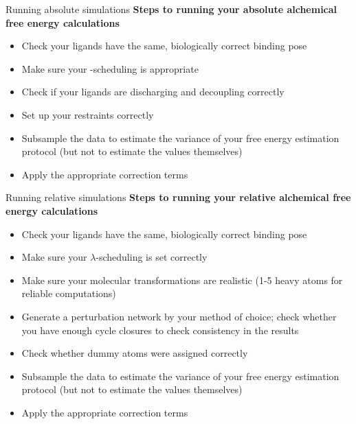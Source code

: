 \documentclass[9pt,bestpractices]{livecoms}
\begin{document}
\begin{Checklists*}
\begin{checklist}{Running absolute simulations}
        \textbf{Steps to running your absolute alchemical free energy calculations}
\begin{itemize}
 \item Check your ligands have the same, biologically correct binding pose
        \item Make sure your \textlambda-scheduling is  appropriate
        \item Check if your ligands are discharging and decoupling correctly
        \item Set up your restraints correctly
        \item Subsample the data to estimate the variance of your free energy estimation protocol (but not to estimate the values themselves)
        \item Apply the appropriate correction terms
\end{itemize}
\end{checklist}

\begin{checklist}{Running relative simulations}
        \textbf{Steps to running your relative alchemical free energy calculations}
\begin{itemize}
   \item Check your ligands  have the same, biologically correct binding pose
        \item Make sure your $\lambda$-scheduling is set correctly
        \item Make sure your molecular transformations are realistic (1-5 heavy atoms for reliable computations)
        \item Generate a perturbation network by your method of choice; check whether you have enough cycle closures to check consistency in the results
        \item Check whether dummy atoms were assigned correctly
        \item Subsample the data to estimate the variance of your free energy estimation protocol (but not to estimate the values themselves)
         \item Apply the appropriate correction terms
\end{itemize}
\end{checklist}
\end{Checklists*}
\end{document}
